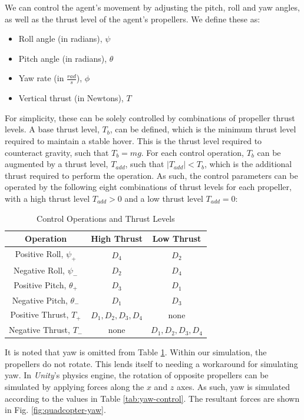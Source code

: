 \documentclass[12pt]{article}
\begin{document}
We can control the agent's movement by adjusting the pitch, roll and yaw angles, as well as the thrust level of the agent's propellers. We define these as:

\begin{itemize}
    \item Roll angle (in radians), $\psi$
    \item Pitch angle (in radians), $\theta$
    \item Yaw rate (in $\frac{rad}{s}$), $\phi$
    \item Vertical thrust (in Newtons), $T$
\end{itemize}


For simplicity, these can be solely controlled by combinations of propeller thrust levels. A base thrust level, $T_b$, can be defined, which is the minimum thrust level required to maintain a stable hover. This is the thrust level required to counteract gravity, such that $T_b = mg$. For each control operation, $T_b$ can be augmented by a thrust level, $T_{add}$, such that $|T_{add}| < T_b$, which is the additional thrust required to perform the operation. As such, the control parameters can be operated by the following eight combinations of thrust levels for each propeller, with a high thrust level $T_{add} > 0$ and a low thrust level $T_{add} = 0$:


\begin{table}[ht]
    \begin{center}
    \begin{tabular}{| c | c | c |} 
    \hline
    Operation & High Thrust & Low Thrust \\ 
    \hline
    Positive Roll, $\psi_+$ & $D_4$ & $D_2$ \\
    \hline
    Negative Roll, $\psi_-$ & $D_2$ & $D_4$ \\
    \hline
    Positive Pitch, $\theta_+$ & $D_3$ & $D_1$ \\
    \hline
    Negative Pitch, $\theta_-$ & $D_1$ & $D_3$ \\
    \hline
    Positive Thrust, $T_+$ & $D_1, D_2, D_3, D_4$ & none \\
    \hline
    Negative Thrust, $T_-$ & none & $D_1, D_2, D_3, D_4$ \\
    \hline
    \end{tabular}
    \end{center}
    \caption{Control Operations and Thrust Levels}
    \label{tab:control}
\end{table}


It is noted that yaw is omitted from Table \ref{tab:control}. Within our simulation, the propellers do not rotate. This lends itself to needing a workaround for simulating yaw. In \emph{Unity}'s physics engine, the rotation of opposite propellers can be simulated by applying forces along the $x$ and $z$ axes. As such, yaw is simulated according to the values in Table \ref{tab:yaw-control}. The resultant forces are shown in Fig. \ref{fig:quadcopter-yaw}.
\end{document}
